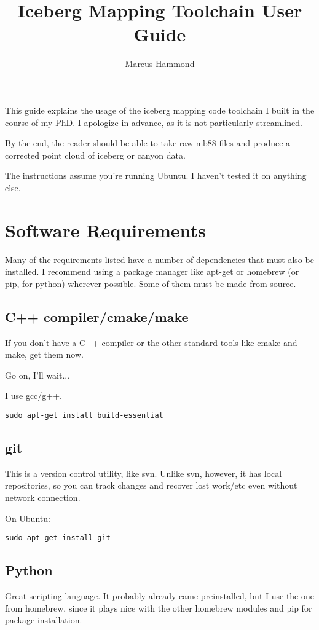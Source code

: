 \documentclass[12pt]{amsart}
\title{Iceberg Mapping Toolchain User Guide}
\author{Marcus Hammond}
\begin{document}
\maketitle
\tableofcontents

This guide explains the usage of the iceberg mapping code toolchain I built in the course of my PhD. I apologize in advance, as it is not particularly streamlined.

By the end, the reader should be able to take raw mb88 files and produce a corrected point cloud of iceberg or canyon data. 

The instructions assume you're running Ubuntu. I haven't tested it on anything else. 

\section{Software Requirements}

Many of the requirements listed have a number of dependencies that must also be installed. I recommend using a package manager like apt-get or homebrew (or pip, for python) wherever possible. Some of them must be made from source.

\subsection{C++ compiler/cmake/make}
If you don't have a C++ compiler or the other standard tools like cmake and make, get them now. 

Go on, I'll wait...

I use gcc/g++.

\begin{lstlisting}
sudo apt-get install build-essential
\end{lstlisting}

\subsection{git}

This is a version control utility, like svn. Unlike svn, however, it has local repositories, so you can track changes and recover lost work/etc even without network connection. 

On Ubuntu: 
\begin{lstlisting}
sudo apt-get install git
\end{lstlisting}


\subsection{Python}
Great scripting language. It probably already came preinstalled, but I use the one from homebrew, since it plays nice with the other homebrew modules and pip for package installation.
\end{document}
